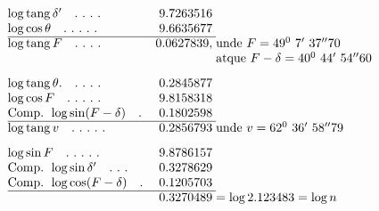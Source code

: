 \[
\begin{array}{@{}l@{\quad}r@{\;}l@{}}
\log\operatorname{tang}\delta'\quad .\ .\ .\ .&9.7263516&\\
\log\cos\theta\quad .\ .\ .\ .\ .&9.6635677&\\\cline{1-2}
\log\operatorname{tang}F\quad .\ .\ .\ .&0.0627839,&\text{unde }F=49^0\ 7'\ 37''70\\
&&\text{atque }F-\delta=40^0\ 44'\ 54''60\\[8pt]
\log\operatorname{tang}\theta.\quad .\ .\ .\ .&0.2845877&\\
\log\cos F\quad .\ .\ .\ .\ .&9.8158318&\\
\text{Comp. }\log\sin(F-\delta)\quad .&0.1802598&\\\cline{1-2}
\log\operatorname{tang}v\quad .\ .\ .\ .\ .&0.2856793&\text{unde }v=62^0\ 36'\ 58''79\\[8pt]
\log\sin F\quad .\ .\ .\ .\ .&9.8786157&\\
\text{Comp. }\log\sin\delta'\quad .\ .\ .&0.3278629&\\
\text{Comp. }\log\cos(F-\delta)\quad .&0.1205703&\\\cline{1-2}
&0.3270489&=\log 2.123483=\log n
\end{array}
\]
\par\clearpage
\endgroup
